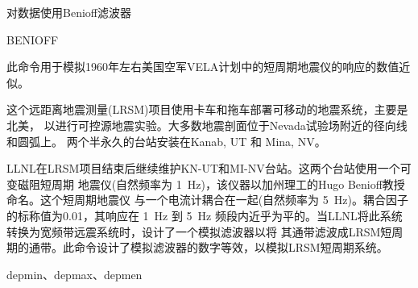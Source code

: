 \label{cmd:benioff}

对数据使用Benioff滤波器

\begin{SACSTX}
BENIOFF
\end{SACSTX}

此命令用于模拟1960年左右美国空军VELA计划中的短周期地震仪的响应的数值近似。

这个远距离地震测量(LRSM)项目使用卡车和拖车部署可移动的地震系统，主要是北美，
以进行可控源地震实验。大多数地震剖面位于Nevada试验场附近的径向线和圆弧上。
两个半永久的台站安装在Kanab, UT 和 Mina, NV。

LLNL在LRSM项目结束后继续维护KN-UT和MI-NV台站。这两个台站使用一个可变磁阻短周期
地震仪(自然频率为 \SI{1}{\Hz})，该仪器以加州理工的Hugo Benioff教授命名。这个短周期地震仪
与一个电流计耦合在一起(自然频率为 \SI{5}{\Hz})。耦合因子的标称值为0.01，其响应在
\SI{1}{\Hz} 到 \SI{5}{\Hz}
频段内近乎为平的。当LLNL将此系统转换为宽频带远震系统时，设计了一个模拟滤波器以将
其通带滤波成LRSM短周期的通带。此命令设计了模拟滤波器的数字等效，以模拟LRSM短周期系统。

depmin、depmax、depmen
